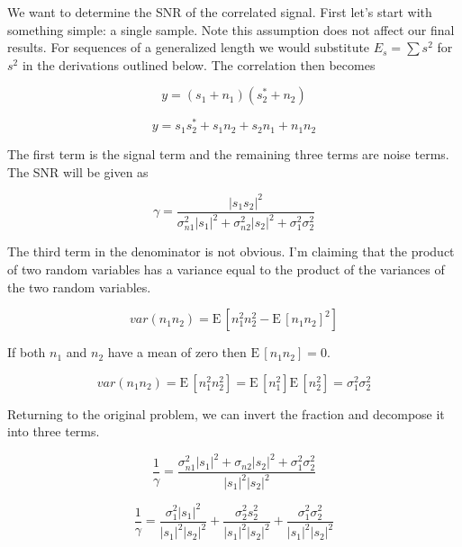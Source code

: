 \documentclass[11pt]{article}
\def\E{{\textrm{E}}\,}
\begin{document}
We want to determine the SNR of the correlated signal. First let's start with something simple: a single sample. Note this assumption does not affect our final results. For sequences of a generalized length we would substitute $E_s = \sum s^2$ for $s^2$ in the derivations outlined below. The correlation then becomes

\begin{equation}
y = (s_1 + n_1)(s_2^* + n_2)
\end{equation}

\begin{equation}
y = s_1 s^*_2 + s_1 n_2 + s_2 n_1 + n_1 n_2
\end{equation}

The first term is the signal term and the remaining three terms are noise terms. The SNR will be given as

\begin{equation}
\gamma = \frac{|s_1 s_2|^2}{\sigma_{n1}^2 |s_1|^2 + \sigma_{n2}^2 |s_2|^2 + \sigma_1^2 \sigma_2^2}
\end{equation}

The third term in the denominator is not obvious. I'm claiming that the product of two random variables has a variance equal to the product of the variances of the two random variables.

\begin{equation}
var (n_1 n_2) = \E[n_1^2 n_2^2 - \E[n_1 n_2]^2]
\end{equation}

If both $n_1$ and $n_2$ have a mean of zero then $\E[n_1 n_2] = 0$.

\begin{equation}
var(n_1 n_2) = \E[n_1^2 n_2^2] = \E[n_1^2] \E[n_2^2] = \sigma_1^2\sigma_2^2
\end{equation}

Returning to the original problem, we can invert the fraction and decompose it into three terms.

\begin{equation}
\frac{1}{\gamma}
=
\frac{\sigma_{n1}^2 |s_1|^2 + \sigma_{n2} |s_2|^2 + \sigma_1^2 \sigma_2^2}{|s_1|^2 |s_2|^2}
\end{equation}

\begin{equation}
\frac{1}{\gamma}
=
\frac{\sigma_1^2 |s_1|^2}{|s_1|^2 |s_2|^2}
+
\frac{\sigma^2_2 s_2^2}{|s_1|^2 |s_2|^2}
+
\frac{\sigma_1^2 \sigma_2^2}{|s_1|^2 |s_2|^2}
\end{equation}
\end{document}
